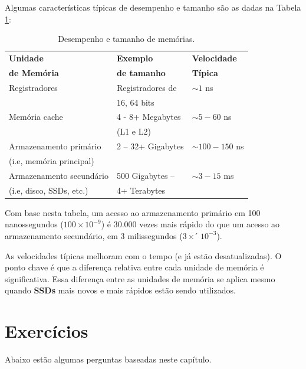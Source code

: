 Algumas características típicas de desempenho e tamanho são as dadas na Tabela \ref{tab:desempenho}:
\begin{table}[h]
	\centering
	\begin{tabular}{|l|l|l|}
		\hline
		\rowcolor[HTML]{C0C0C0} 
		\textbf{Unidade} & \textbf{Exemplo} & \textbf{Velocidade} \\ 
		\rowcolor[HTML]{C0C0C0} 
		\textbf{de Memória} & \textbf{de tamanho} & \textbf{Típica} \\ 
		Registradores & Registradores de  & $  \sim1 $ ns\\ 
		& 16, 64 bits &\\ \hline
		Memória cache & 4 - 8+ Megabytes  & $  \sim5-60 $ ns\\ 
		& (L1 e L2)& \\ \hline
		Armazenamento primário & 2 – 32+ Gigabytes & $  \sim100-150 $ ns\\ 
		 (i.e, memória principal) & &\\ \hline
		Armazenamento secundário  & 500 Gigabytes --  & $  \sim3-15 $ ms\\ 
		(i.e, disco, SSDs, etc.) & 4+ Terabytes& \\\hline
	\end{tabular}
	
	\caption{Desempenho e tamanho de memórias.}
	\label{tab:desempenho}
\end{table}

Com base nesta tabela, um acesso ao armazenamento primário em 100 nanossegundos ($ 100 \times 10^{-9} $) é 30.000 vezes mais rápido do que um acesso ao armazenamento secundário, em 3 milissegundos ($ 3 \times ́10^{-3} $).

As velocidades típicas melhoram com o tempo (e já estão desatualizadas). O ponto chave é que a diferença relativa entre cada unidade de memória é significativa. Essa diferença entre as unidades de memória se aplica mesmo quando \textbf{SSDs} mais novos e mais rápidos estão sendo utilizados.

\section{Exercícios}
Abaixo estão algumas perguntas baseadas neste capítulo.

